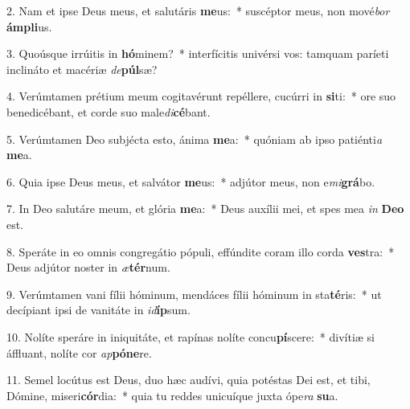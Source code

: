 2. Nam et ipse Deus meus, et salutáris \textbf{me}us:~*  suscéptor meus, non mové\textit{bor} \textbf{ám}\textbf{pli}us.\

3. Quoúsque irrúitis in \textbf{hó}minem?~*  interfícitis univérsi vos: tamquam paríeti inclináto et macériæ \textit{de}\textbf{púl}sæ?\

4. Verúmtamen prétium meum cogitavérunt repéllere, cucúrri in \textbf{si}ti:~*  ore suo benedicébant, et corde suo male\textit{di}\textbf{cé}bant.\

5. Verúmtamen Deo subjécta esto, ánima \textbf{me}a:~*  quóniam ab ipso patiénti\textit{a} \textbf{me}a.\

6. Quia ipse Deus meus, et salvátor \textbf{me}us:~*  adjútor meus, non e\textit{mi}\textbf{grá}bo.\

7. In Deo salutáre meum, et glória \textbf{me}a:~*  Deus auxílii mei, et spes mea \textit{in} \textbf{De}\textbf{o} est.\

8. Speráte in eo omnis congregátio pópuli, effúndite coram illo corda \textbf{ves}tra:~*  Deus adjútor noster in \textit{æ}\textbf{tér}num.\

9. Verúmtamen vani fílii hóminum, mendáces fílii hóminum in sta\textbf{té}ris:~*  ut decípiant ipsi de vanitáte in \textit{id}\textbf{íp}sum.\

10. Nolíte speráre in iniquitáte, et rapínas nolíte concu\textbf{pí}scere:~*  divítiæ si áffluant, nolíte cor \textit{ap}\textbf{pó}\textbf{ne}re.\

11. Semel locútus est Deus, duo hæc audívi, quia potéstas Dei est, et tibi, Dómine, miseri\textbf{cór}dia:~*  quia tu reddes unicuíque juxta ópe\textit{ra} \textbf{su}a.\

